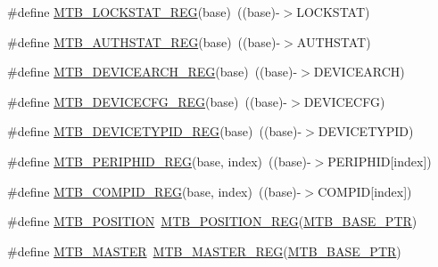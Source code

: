 \begin{DoxyCompactItemize}
\#define \hyperlink{group___m_t_b___register___accessor___macros_ga46969ca43e5680eefbd36c829c1194a1}{M\+T\+B\+\_\+\+L\+O\+C\+K\+S\+T\+A\+T\+\_\+\+R\+EG}(base)~((base)-\/$>$L\+O\+C\+K\+S\+T\+AT)
\item 
\#define \hyperlink{group___m_t_b___register___accessor___macros_gab2cb70e8dbcd3c7e0befc4adc320361c}{M\+T\+B\+\_\+\+A\+U\+T\+H\+S\+T\+A\+T\+\_\+\+R\+EG}(base)~((base)-\/$>$A\+U\+T\+H\+S\+T\+AT)
\item 
\#define \hyperlink{group___m_t_b___register___accessor___macros_gaee07e23608c4ed76b2b145ba15f98cf4}{M\+T\+B\+\_\+\+D\+E\+V\+I\+C\+E\+A\+R\+C\+H\+\_\+\+R\+EG}(base)~((base)-\/$>$D\+E\+V\+I\+C\+E\+A\+R\+CH)
\item 
\#define \hyperlink{group___m_t_b___register___accessor___macros_ga60039245faedb5ba2ff9273bcd6114be}{M\+T\+B\+\_\+\+D\+E\+V\+I\+C\+E\+C\+F\+G\+\_\+\+R\+EG}(base)~((base)-\/$>$D\+E\+V\+I\+C\+E\+C\+FG)
\item 
\#define \hyperlink{group___m_t_b___register___accessor___macros_gae7ac311868bb09e22c9d90571eb1a174}{M\+T\+B\+\_\+\+D\+E\+V\+I\+C\+E\+T\+Y\+P\+I\+D\+\_\+\+R\+EG}(base)~((base)-\/$>$D\+E\+V\+I\+C\+E\+T\+Y\+P\+ID)
\item 
\#define \hyperlink{group___m_t_b___register___accessor___macros_ga1c831bceebde1093b9603f4c5d5001fa}{M\+T\+B\+\_\+\+P\+E\+R\+I\+P\+H\+I\+D\+\_\+\+R\+EG}(base,  index)~((base)-\/$>$P\+E\+R\+I\+P\+H\+ID\mbox{[}index\mbox{]})
\item 
\#define \hyperlink{group___m_t_b___register___accessor___macros_gaac63d251aca1f616d48a106b19ec2504}{M\+T\+B\+\_\+\+C\+O\+M\+P\+I\+D\+\_\+\+R\+EG}(base,  index)~((base)-\/$>$C\+O\+M\+P\+ID\mbox{[}index\mbox{]})
\item 
\#define \hyperlink{group___m_t_b___register___accessor___macros_ga2356017c5dd8a963f2566b41cdb0e2ea}{M\+T\+B\+\_\+\+P\+O\+S\+I\+T\+I\+ON}~\hyperlink{group___m_t_b___register___accessor___macros_gab09a5c0d30a1ff9148269b45679f0a96}{M\+T\+B\+\_\+\+P\+O\+S\+I\+T\+I\+O\+N\+\_\+\+R\+EG}(\hyperlink{group___m_t_b___peripheral_gadf7f362dfa67354951e6a23ddf08cd73}{M\+T\+B\+\_\+\+B\+A\+S\+E\+\_\+\+P\+TR})
\item 
\#define \hyperlink{group___m_t_b___register___accessor___macros_ga8790f019f8279bebf92068c9f295280f}{M\+T\+B\+\_\+\+M\+A\+S\+T\+ER}~\hyperlink{group___m_t_b___register___accessor___macros_ga142ef5fc493afaf8160fe03488ff03a1}{M\+T\+B\+\_\+\+M\+A\+S\+T\+E\+R\+\_\+\+R\+EG}(\hyperlink{group___m_t_b___peripheral_gadf7f362dfa67354951e6a23ddf08cd73}{M\+T\+B\+\_\+\+B\+A\+S\+E\+\_\+\+P\+TR})
\item 

\end{DoxyCompactItemize}
